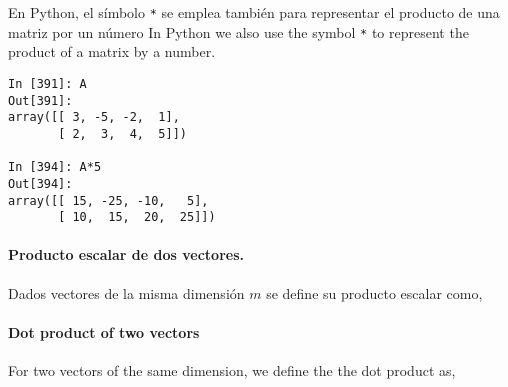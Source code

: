\begin{paracol}{2}
En Python, el símbolo \texttt{*} se emplea también para representar el producto de una matriz por un número
\switchcolumn
In Python we also use the symbol \texttt{*} to represent the product of a matrix by a number.
\end{paracol}

\begin{center}
    \begin{minipage}{0.5\textwidth}
        \begin{verbatim}
In [391]: A
Out[391]: 
array([[ 3, -5, -2,  1],
       [ 2,  3,  4,  5]])

In [394]: A*5
Out[394]: 
array([[ 15, -25, -10,   5],
       [ 10,  15,  20,  25]])
        \end{verbatim}
    \end{minipage}
\end{center}

\begin{paracol}{2}
\paragraph{Producto escalar de dos vectores.} Dados vectores de la misma dimensión $m$ se define su producto escalar como,
\switchcolumn
\paragraph{Dot product of two vectors}
For two vectors of the same dimension, we define the the dot product as,    
\end{paracol}


